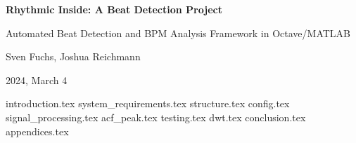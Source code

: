 \documentclass[a4paper,12pt,oneside]{article}
\begin{document}
\pagestyle{fancy}

\begin{titlepage}
    \centering
    \vspace*{1cm}
    
    {\Large\bfseries Rhythmic Inside: A Beat Detection Project\par}
    \vspace{0.5cm}
    {\large Automated Beat Detection and BPM Analysis Framework in Octave/MATLAB\par}
    
    \vspace{1.5cm}
    
    {\Large Sven Fuchs, Joshua Reichmann\par}
    \vspace{0.5cm}
    {\Large 2024, March 4\par}
    
    \vfill
\end{titlepage}

\tableofcontents
\newpage


{introduction.tex}
{system_requirements.tex}
{structure.tex}
{config.tex}
{signal_processing.tex}
{acf_peak.tex}
{testing.tex}
{dwt.tex}
{conclusion.tex}
{appendices.tex}

\newpage
\printbibliography
\listoffigures
\listoftables
\end{document}
